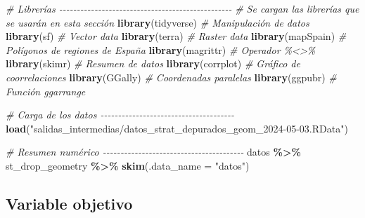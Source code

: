 \documentclass[12pt,a4paper,]{book}
\newenvironment{Shaded}{\begin{snugshade}}{\end{snugshade}}
\newcommand{\AttributeTok}[1]{\textcolor[rgb]{0.13,0.29,0.53}{#1}}
\newcommand{\CommentTok}[1]{\textcolor[rgb]{0.56,0.35,0.01}{\textit{#1}}}
\newcommand{\FunctionTok}[1]{\textcolor[rgb]{0.13,0.29,0.53}{\textbf{#1}}}
\newcommand{\NormalTok}[1]{#1}
\newcommand{\SpecialCharTok}[1]{\textcolor[rgb]{0.81,0.36,0.00}{\textbf{#1}}}
\newcommand{\StringTok}[1]{\textcolor[rgb]{0.31,0.60,0.02}{#1}}
\numberwithin{dummy}{section}
\theoremstyle{ocrenumbox}
\theoremstyle{blacknumex}
\theoremstyle{blacknumbox}
\theoremstyle{ocrenum}
\theoremstyle{ocrenum}
\begin{document}
\begin{Shaded}
\begin{Highlighting}[]
\CommentTok{\# Librerías {-}{-}{-}{-}{-}{-}{-}{-}{-}{-}{-}{-}{-}{-}{-}{-}{-}{-}{-}{-}{-}{-}{-}{-}{-}{-}{-}{-}{-}{-}{-}{-}{-}{-}{-}{-}{-}{-}{-}{-}{-}{-}{-}{-}{-}{-}{-}{-}{-}}
\CommentTok{\# Se cargan las librerías que se usarán en esta sección}
\FunctionTok{library}\NormalTok{(tidyverse) }\CommentTok{\# Manipulación de datos }
\FunctionTok{library}\NormalTok{(sf) }\CommentTok{\# Vector data}
\FunctionTok{library}\NormalTok{(terra) }\CommentTok{\# Raster data}
\FunctionTok{library}\NormalTok{(mapSpain) }\CommentTok{\# Polígonos de regiones de España}
\FunctionTok{library}\NormalTok{(magrittr) }\CommentTok{\# Operador \%\textless{}\textgreater{}\% }
\FunctionTok{library}\NormalTok{(skimr) }\CommentTok{\# Resumen de datos}
\FunctionTok{library}\NormalTok{(corrplot) }\CommentTok{\# Gráfico de coorrelaciones}
\FunctionTok{library}\NormalTok{(GGally) }\CommentTok{\# Coordenadas paralelas}
\FunctionTok{library}\NormalTok{(ggpubr) }\CommentTok{\# Función ggarrange}

\CommentTok{\# Carga de los datos {-}{-}{-}{-}{-}{-}{-}{-}{-}{-}{-}{-}{-}{-}{-}{-}{-}{-}{-}{-}{-}{-}{-}{-}{-}{-}{-}{-}{-}{-}{-}{-}{-}{-}{-}{-}{-}{-}}
\FunctionTok{load}\NormalTok{(}\StringTok{"salidas\_intermedias/datos\_strat\_depurados\_geom\_2024{-}05{-}03.RData"}\NormalTok{)}

\CommentTok{\# Resumen numérico {-}{-}{-}{-}{-}{-}{-}{-}{-}{-}{-}{-}{-}{-}{-}{-}{-}{-}{-}{-}{-}{-}{-}{-}{-}{-}{-}{-}{-}{-}{-}{-}{-}{-}{-}{-}{-}{-}{-}{-}}
\NormalTok{datos }\SpecialCharTok{\%\textgreater{}\%}\NormalTok{  st\_drop\_geometry }\SpecialCharTok{\%\textgreater{}\%} \FunctionTok{skim}\NormalTok{(}\AttributeTok{.data\_name =} \StringTok{"datos"}\NormalTok{)}
\end{Highlighting}
\end{Shaded}

\hypertarget{variable-objetivo-1}{%
\subsection{Variable objetivo}\label{variable-objetivo-1}}
\end{document}
